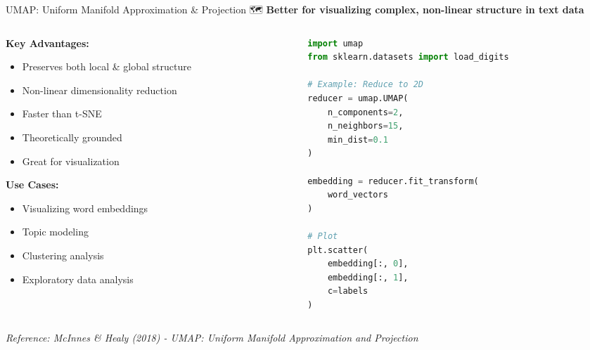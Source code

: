 \documentclass[aspectratio=169]{beamer}
\begin{document}
\begin{frame}[fragile,shrink=10]{UMAP: Uniform Manifold Approximation \& Projection 🗺️}
\textbf{Better for visualizing complex, non-linear structure in text data}

\vspace{0.5em}

\begin{columns}[T]
\begin{column}{0.48\textwidth}
\textbf{Key Advantages:}
\begin{itemize}\setlength{\itemsep}{0pt}
    \item Preserves both local \& global structure
    \item Non-linear dimensionality reduction
    \item Faster than t-SNE
    \item Theoretically grounded
    \item Great for visualization
\end{itemize}

\vspace{0.5em}
\textbf{Use Cases:}
\begin{itemize}\setlength{\itemsep}{0pt}
    \item Visualizing word embeddings
    \item Topic modeling
    \item Clustering analysis
    \item Exploratory data analysis
\end{itemize}
\end{column}

\begin{column}{0.48\textwidth}
\begin{lstlisting}[language=Python]
import umap
from sklearn.datasets import load_digits

# Example: Reduce to 2D
reducer = umap.UMAP(
    n_components=2,
    n_neighbors=15,
    min_dist=0.1
)

embedding = reducer.fit_transform(
    word_vectors
)

# Plot
plt.scatter(
    embedding[:, 0],
    embedding[:, 1],
    c=labels
)
\end{lstlisting}
\end{column}
\end{columns}

\vspace{0.5em}
\small
\textit{Reference: McInnes \& Healy (2018) - UMAP: Uniform Manifold Approximation and Projection}
\end{frame}
\end{document}
